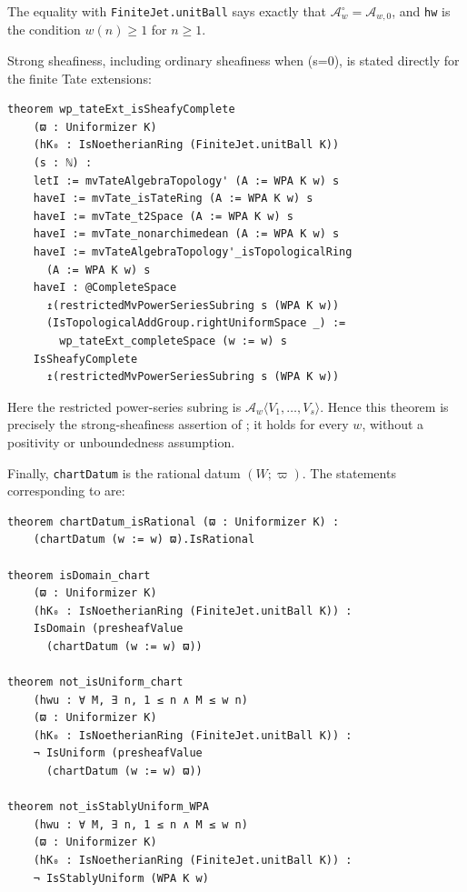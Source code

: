 \documentclass[11pt,reqno]{amsart}
\theoremstyle{definition}
\begin{document}
The equality with \texttt{FiniteJet.unitBall} says exactly that
\(\mathcal A_w^\circ=\mathcal A_{w,0}\), and \texttt{hw} is the condition
\(w(n)\geq1\) for \(n\geq1\).

Strong sheafiness, including ordinary sheafiness when (s=0), is stated
directly for the finite Tate extensions:

\begin{lstlisting}
theorem wp_tateExt_isSheafyComplete
    (ϖ : Uniformizer K)
    (hK₀ : IsNoetherianRing (FiniteJet.unitBall K))
    (s : ℕ) :
    letI := mvTateAlgebraTopology' (A := WPA K w) s
    haveI := mvTate_isTateRing (A := WPA K w) s
    haveI := mvTate_t2Space (A := WPA K w) s
    haveI := mvTate_nonarchimedean (A := WPA K w) s
    haveI := mvTateAlgebraTopology'_isTopologicalRing
      (A := WPA K w) s
    haveI : @CompleteSpace
      ↥(restrictedMvPowerSeriesSubring s (WPA K w))
      (IsTopologicalAddGroup.rightUniformSpace _) :=
        wp_tateExt_completeSpace (w := w) s
    IsSheafyComplete
      ↥(restrictedMvPowerSeriesSubring s (WPA K w))
\end{lstlisting}

Here the restricted power-series subring is
\(\mathcal A_w\langle V_1,\ldots,V_s\rangle\).  Hence this theorem is precisely
the strong-sheafiness assertion of ; it holds for every
\(w\), without a positivity or unboundedness assumption.

Finally, \texttt{chartDatum} is the rational datum \((W;\varpi)\).  The
statements corresponding to
are:

\begin{lstlisting}
theorem chartDatum_isRational (ϖ : Uniformizer K) :
    (chartDatum (w := w) ϖ).IsRational

theorem isDomain_chart
    (ϖ : Uniformizer K)
    (hK₀ : IsNoetherianRing (FiniteJet.unitBall K)) :
    IsDomain (presheafValue
      (chartDatum (w := w) ϖ))

theorem not_isUniform_chart
    (hwu : ∀ M, ∃ n, 1 ≤ n ∧ M ≤ w n)
    (ϖ : Uniformizer K)
    (hK₀ : IsNoetherianRing (FiniteJet.unitBall K)) :
    ¬ IsUniform (presheafValue
      (chartDatum (w := w) ϖ))

theorem not_isStablyUniform_WPA
    (hwu : ∀ M, ∃ n, 1 ≤ n ∧ M ≤ w n)
    (ϖ : Uniformizer K)
    (hK₀ : IsNoetherianRing (FiniteJet.unitBall K)) :
    ¬ IsStablyUniform (WPA K w)
\end{lstlisting}
\end{document}
